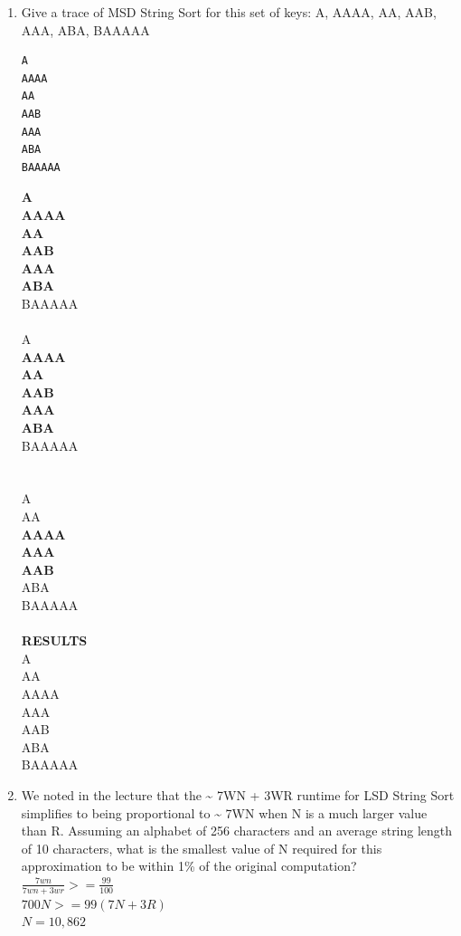 \documentclass{article}
\begin{document}
\begin{enumerate}
\begin{tikzpicture}[node distance = 2cm, auto]
\end{tikzpicture}
\newpage
\item Give a trace of MSD String Sort for this set of keys: A, AAAA, AA, AAB, AAA, ABA, BAAAAA
\begin{lstlisting}
A
AAAA
AA
AAB
AAA
ABA
BAAAAA
\end{lstlisting}
\textbf{A \\
AAAA \\
AA\\
AAB\\
AAA\\
ABA} \\
BAAAAA
\\
\\
A \\
\textbf{AAAA \\
AA \\
AAB \\
AAA \\
ABA} \\
BAAAAA \\
\\
\\

A \\
AA \\
\textbf{AAAA \\
AAA\\
AAB} \\
ABA \\
BAAAAA \\
\\
\textbf{RESULTS }
\\
A\\
AA\\
AAAA\\
AAA\\
AAB\\
ABA\\
BAAAAA\\
\newpage
\item We noted in the lecture that the \~{} 7WN + 3WR runtime for LSD String Sort simplifies to being proportional to \~{} 7WN when N is a much larger value than R. Assuming an alphabet of 256 characters and an average string length of 10 characters, what is the smallest value of N required for this approximation to be within 1\% of the original computation?
\\
$\frac{7wn}{7wn + 3wr} >= \frac{99}{100}$\\
$700N >= 99 (7N +3R)$\\
$N = 10, 862$
\end{enumerate}
\end{document}
